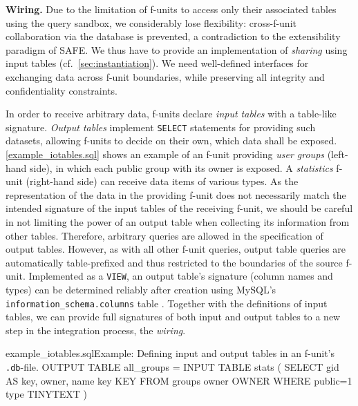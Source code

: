 \documentclass{src/acm_proc_article-sp} \else
\newcommand\myparagraph[1]{\medskip\noindent\textbf{#1.}}
\newcommand\SAFE{SAFE\xspace}
\begin{document}
\myparagraph{Wiring}
Due to the limitation of f-units to access only their associated
tables using the query sandbox, we considerably lose flexibility:
cross-f-unit collaboration via the database is prevented, a
contradiction to the extensibility paradigm of \SAFE. We thus have
to provide an implementation of \emph{sharing} using input tables
(cf.~\autoref{sec:instantiation}). We need well-defined interfaces
for exchanging data across f-unit boundaries, while preserving all
integrity and confidentiality constraints.

In order to receive arbitrary data, f-units declare \emph{input
tables} with a table-like signature. \emph{Output tables} implement
\texttt{SELECT} statements for providing such datasets, allowing
f-units to decide on their own, which data shall be exposed.
\autoref{example_iotables.sql} shows an example of an f-unit
providing \emph{user groups} (left-hand side), in which each public
group with its owner is exposed. A \emph{statistics} f-unit
(right-hand side) can receive data items of various types.
As the representation of the data in the providing f-unit does not
necessarily match the intended signature of the input tables of the
receiving f-unit, we should be careful in not limiting the power of
an output table when collecting its information from other tables.
Therefore, arbitrary queries are allowed in the specification of
output tables. However, as with all other f-unit queries, output
table queries are automatically table-pre\-fixed and thus restricted
to the boundaries of the source f-unit. Implemented as a
\texttt{VIEW}, an output table's signature (column names and types)
can be determined reliably after creation using MySQL's
\texttt{information\_schema.columns} table
\cite{mysql-columns-table}. Together with the definitions of input
tables, we can provide full signatures of both input and output
tables to a new step in the integration process, the \emph{wiring}.
\begin{lstfloat}{example_iotables.sql}{Example: Defining input and output tables in an f-unit's \texttt{.db}-file.}
  OUTPUT TABLE all_groups =                INPUT TABLE stats (
    SELECT gid AS key, owner, name           key    KEY
    FROM   groups                            owner  OWNER
    WHERE  public=1                          type   TINYTEXT )
\end{lstfloat}
\end{document}
